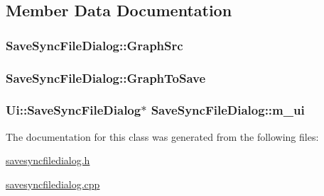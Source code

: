 \subsection{Member Data Documentation}
\hypertarget{class_save_sync_file_dialog_3f2d0e497574670ff938db7db4490fe5}{
\subsubsection[{GraphSrc}]{ {\bf SaveSyncFileDialog::GraphSrc}}}
\label{class_save_sync_file_dialog_3f2d0e497574670ff938db7db4490fe5}


\hypertarget{class_save_sync_file_dialog_218cd59731116b00fefe8cd057a77747}{
\subsubsection[{GraphToSave}]{ {\bf SaveSyncFileDialog::GraphToSave}}}
\label{class_save_sync_file_dialog_218cd59731116b00fefe8cd057a77747}


\hypertarget{class_save_sync_file_dialog_b95314c8667bb468a1edc52b3354057c}{
\subsubsection[{m\_\-ui}]{\setlength{\rightskip}{0pt plus 5cm}Ui::SaveSyncFileDialog$\ast$ {\bf SaveSyncFileDialog::m\_\-ui}}}
\label{class_save_sync_file_dialog_b95314c8667bb468a1edc52b3354057c}




The documentation for this class was generated from the following files:\begin{CompactItemize}
\item 
\hyperlink{savesyncfiledialog_8h}{savesyncfiledialog.h}\item 
\hyperlink{savesyncfiledialog_8cpp}{savesyncfiledialog.cpp}\end{CompactItemize}
